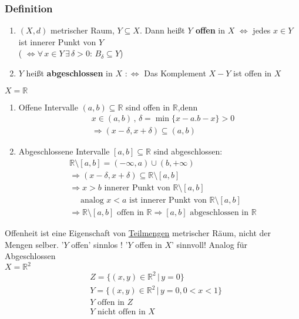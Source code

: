 \subsubsection[Offen, Abgeschlossen]{Definition} %
\label{ssub:definition}
\begin{enumerate}
	\item $(X,d)$ metrischer Raum, $Y \subseteq X$. Dann heißt {\bfseries $Y$ offen} in $X$ $\Leftrightarrow $ jedes $x \in Y$ ist innerer Punkt von $Y$ \\
	( $\Leftrightarrow \forall\, x \in Y \, \exists \, \delta >0: \, B_{\delta } \subseteq Y$)
	\item $Y$ heißt {\bfseries abgeschlossen} in $X$ $:\Leftrightarrow $ Das Komplement $X-Y$ ist offen in $X$
\end{enumerate}
 $X = \mathbb{R}$
 \begin{enumerate}
 	\item Offene Intervalle $(a,b) \subseteq \mathbb{R}$ sind offen in $\mathbb{R}$,denn
  \begin{align*}
  	&x \in (a,b) \,,\, \delta = \min \{ x-a.b-x \} >0 \\
	&\Rightarrow (x-\delta ,x+\delta ) \subseteq (a,b)
  \end{align*}  
  
 \item Abgeschlossene Intervalle $[a,b] \subseteq \mathbb{R}$ sind abgeschlossen: 
 \begin{align*}
 	&\mathbb{R} \setminus [a,b] = (-\infty,a) \cup (b, +\infty) \\
 	&\Rightarrow (x-\delta ,x+\delta ) \subseteq \mathbb{R} \setminus [a,b] \\
	&\Rightarrow x>b \text{ innerer Punkt von } \mathbb{R} \setminus[a,b] \\
	&\quad \text{ analog } x<a \text{ ist innerer Punkt von } \mathbb{R}\setminus[a,b] \\
	&\Rightarrow \mathbb{R}\setminus[a,b] \text{ offen in } \mathbb{R} \Rightarrow  [a,b] \text{ abgeschlossen in } \mathbb{R} 
\end{align*}
\end{enumerate}

Offenheit ist eine Eigenschaft von \underline{Teilmengen} metrischer Räum, nicht der Mengen selber. '$Y$ offen' sinnlos ! '$Y$ offen in $X$' sinnvoll! Analog für Abgeschlossen
 \\
$X = \mathbb{R}^2$ \\
\begin{align*}
	&Z = \{ (x,y) \in \mathbb{R}^2\, |\, y=0 \} \\
	&Y = \{ (x,y) \in \mathbb{R}^2 \, | \, y=0,0<x<1 \} \\
	&Y \text{ offen in } Z \\
	&Y \text{ nicht offen in } X \\
	\end{align*}
